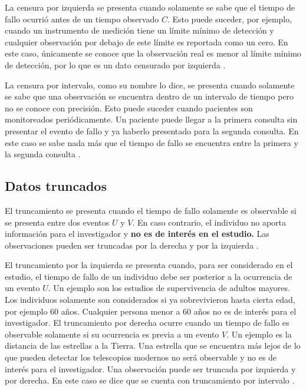 \documentclass[11pt,a4paper]{article}
\begin{document}
La censura por izquierda se presenta cuando solamente se sabe que el tiempo de fallo ocurrió antes de un tiempo observado $C$. Esto puede suceder, por ejemplo, cuando un instrumento de medición tiene un límite mínimo de detección y cualquier observación por debajo de este límite es reportada como un cero. En este caso, únicamente se conoce que la observación real es menor al límite mínimo de detección, por lo que es un dato censurado por izquierda \citep{klein}.

La censura por intervalo, como su nombre lo dice, se presenta cuando solamente se sabe que una observación se encuentra dentro de un intervalo de tiempo pero no se conoce con precisión. Esto puede suceder cuando pacientes son monitoreados periódicamente. Un paciente puede llegar a la primera consulta sin presentar el evento de fallo y ya haberlo presentado para la segunda consulta. En este caso se sabe nada más que el tiempo de fallo se encuentra entre la primera y la segunda consulta \citep{klein}. 

\subsection{Datos truncados}
\label{sec:truncados}

El truncamiento se presenta cuando el tiempo de fallo solamente es observable si se presenta entre dos eventos $U$ y $V$. En caso contrario, el individuo no aporta información para el investigador y \textbf{no es de interés en el estudio.} Las observaciones pueden ser truncadas por la derecha y por la izquierda \citep{klein}.

El truncamiento por la izquierda se presenta cuando, para ser considerado en el estudio, el tiempo de fallo de un individuo debe ser posterior  a la ocurrencia de un evento $U$. Un ejemplo son los estudios de supervivencia de adultos mayores. Los individuos solamente son considerados si ya sobrevivieron hasta cierta edad, por ejemplo 60 años. Cualquier persona menor a 60 años no es de interés para el investigador. El truncamiento por derecha ocurre cuando un tiempo de fallo es observable solamente si su ocurrencia es previa a un evento $V$. Un ejemplo es la distancia de las estrellas a la Tierra. Una estrella que se encuentra más lejos de lo que pueden detectar los telescopios modernos no será observable y no es de interés para el investigador. Una observación puede ser truncada por izquierda y por derecha. En este caso se dice que se cuenta con truncamiento por intervalo \citep{klein}.
\end{document}
